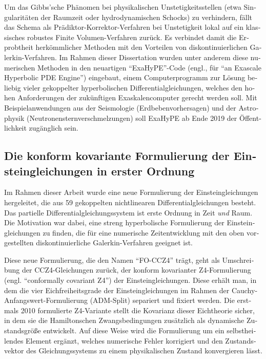\begin{otherlanguage}{german}
\begin{fullwidth}
\begin{center}
\begin{adjustwidth}{1cm}{1cm}
Um das Gibbs'sche Phänomen bei physikalischen Unstetigkeitsstellen (etwa
Singularitäten der Raumzeit oder hydrodynamischen Schocks) zu verhindern,
fällt das Schema als Prädiktor-Korrektor-Verfah\-ren bei Unstetigkeit lokal
auf ein klassisches robustes Finite Volumen-Verfah\-ren zurück. Es verbindet
damit die Erprobtheit herkömmlicher Methoden mit den Vorteilen von
diskontinuierlichen Galerkin-Verfahren.
Im Rahmen dieser Dissertation wurden unter anderem diese numerischen Methoden
in den neuartigen ``ExaHyPE''-Code (engl., für ``an Exascale Hyperbolic PDE
Engine'') eingebaut, einem Computerprogramm zur Lösung beliebig vieler gekoppelter
hyperbolischen Differentialgleichungen, welches den hohen Anforderungen der
zukünftigen Exaskalencomputer gerecht werden soll. Mit Beispielanwendungen aus
der Seismologie (Erdbebenvorhersagen) und der Astrophysik
(Neutronensternverschmelzungen) soll ExaHyPE ab Ende 2019 der Öffentlichkeit
zugänglich sein.

\subsection*{Die konform kovariante Formulierung der Einsteingleichungen in 
erster Ordnung}
Im Rahmen dieser Arbeit wurde eine neue Formulierung der Einsteingleichungen
hergeleitet, die aus 59 gekoppelten nichtlinearen Differentialgleichungen besteht.
Das partielle Differentialgleichungssystem ist erste Ordnung in Zeit
\emph{und} Raum. Die Motivation war dabei, eine streng hyperbolische
Formulierung der Einsteingleichungen zu finden, die für eine numerische
Zeitentwicklung mit den oben vorgestellten diskontinuierliche Galerkin-Verfahren
geeignet ist.

Diese neue Formulierung, die den Namen ``FO-CCZ4'' trägt, geht als Umschreibung
der CCZ4-Gleichung\-en zurück, der konform kovarianter Z4-Formulierung (engl.
``conformally covariant Z4'') der Einsteingleichungen. Diese erhält man, in
dem die vier Eichfreiheitsgrade der Einsteingleichungen im Rahmen der
Cauchy-Anfangswert-Formulierung (ADM-Split) separiert und fixiert werden.
Die erstmals 2010 formulierte Z4-Variante stellt die Kovarianz dieser
Eichtheorie sicher, in dem sie die Hamiltonschen Zwangsbedingungen zusätzlich
als dynamische Zustandsgröße entwickelt. Auf diese Weise wird die Formulierung
um ein selbstheilendes Element ergänzt, welches numerische Fehler korrigiert
und den Zustandsvektor des Gleichungssystems zu einem physikalischen Zustand
konvergieren lässt.


\end{adjustwidth}
\end{center}
\end{fullwidth}
\end{otherlanguage}
